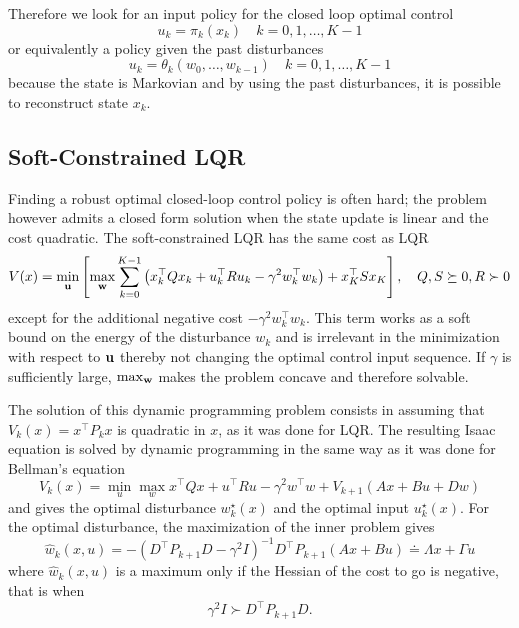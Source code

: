 Therefore we look for an input policy for the closed loop optimal control
\begin{equation*}
  u_k = \pi_k(x_k)\quad k=0,1,\ldots, K-1
\end{equation*}
or equivalently a policy given the past disturbances
\begin{equation*}
  u_k = \theta_k(w_0,\ldots,w_{k-1})\quad k=0,1,\ldots, K-1
\end{equation*}
because the state is Markovian and by using the past disturbances, it is possible to reconstruct state $x_k$.

\subsection{Soft-Constrained LQR}
\label{sec:soft-constrained-lqr}

Finding a robust optimal closed-loop control policy is often hard; the problem however admits a closed form solution when the state update is linear and the cost quadratic. The soft-constrained LQR has the same cost as LQR
\begin{equation*}
  V(x) = \min_{\boldsymbol{\mathrm{u}}} \left[\max_{\boldsymbol{\mathrm{w}}} \sum_{k=0}^{K-1} \left(x_k^\top Qx_k + u_k^\top R u_k - \gamma^2 w_k^\top w_k\right) + x_K^\top Sx_K\right],\quad Q,S\succeq 0, R\succ 0
\end{equation*}
except for the additional negative cost $-\gamma^2 w_k^\top w_k$. This term works as a soft bound on the energy of the disturbance $w_k$ and is irrelevant in the minimization with respect to $\boldsymbol{\mathrm{u}}$ thereby not changing the optimal control input sequence. If $\gamma$ is sufficiently large, $\max_{\boldsymbol{\mathrm{w}}}$ makes the problem concave and therefore solvable.

The solution of this dynamic programming problem consists in assuming that $V_k(x) = x^\top P_kx$ is quadratic in $x$, as it was done for LQR. The resulting Isaac equation is solved by dynamic programming in the same way as it was done for Bellman's equation
\begin{equation*}
  V_k(x) = \min_u \max_w x^\top Qx + u^\top Ru - \gamma^2 w^\top w + V_{k+1}(Ax+Bu+Dw)
\end{equation*}
and gives the optimal disturbance $w_k^\star(x)$ and the optimal input $u_k^\star(x)$. For the optimal disturbance, the maximization of the inner problem gives
\begin{equation*}
  \hat{w}_k(x,u) = -(D^\top P_{k+1}D-\gamma^2I)^{-1}D^\top P_{k+1} (Ax+Bu) \doteq \Lambda x + \Gamma u
\end{equation*}
where $\hat{w}_k(x,u)$ is a maximum only if the Hessian of the cost to go is negative, that is when
\begin{equation*}
  \gamma^2 I \succ D^\top P_{k+1}D.
\end{equation*}

